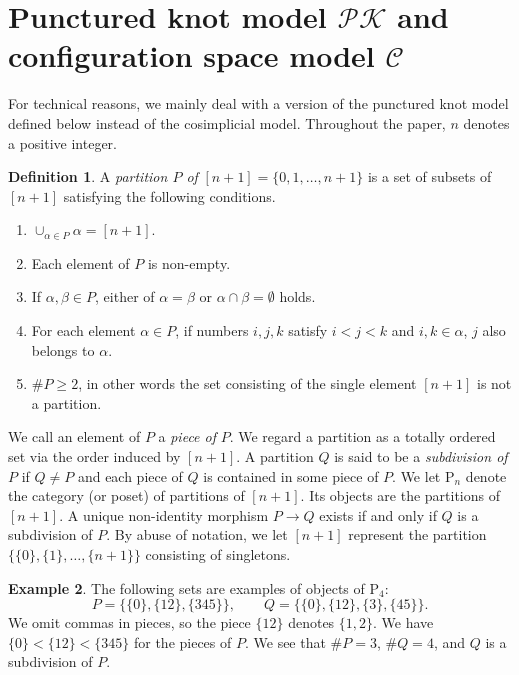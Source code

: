 \documentclass[reqno]{amsart}
\theoremstyle{definition}
\newtheorem{defi}{Definition}[section]
\newtheorem{exa}[defi]{Example}
\theoremstyle{plain}
\newcommand{\PK}{\mathcal{PK}} %
\newcommand{\PP}{\mathrm{P}} %
\begin{document}
\section{Punctured knot model $\PK$ and  configuration space model $\mathcal{C}$ }\label{SPK}
For technical reasons, we mainly deal with a version of the punctured knot model defined below instead of the cosimplicial model.  Throughout the paper, $n$ denotes a positive integer.
\begin{defi}\label{Dpartition0}
A {\em partition $P$ of } $[n+1]=\{0,1,\dots, n+1\}$ is a set of subsets of $[n+1]$ satisfying the following conditions.
\begin{enumerate}
\item $\cup_{\alpha \in P}\alpha =[n+1]$.
\item Each element of  $P$ is non-empty.
\item If $\alpha, \beta \in P$, either of $\alpha=\beta$ or $\alpha\cap \beta=\emptyset$ holds.
\item For each element  $\alpha \in P$, if numbers $i,j,k$ satisfy $i<j<k$ and $i,k\in \alpha$, $j$ also belongs to $\alpha$. 
\item $\# P\geq 2$, in other words the set consisting of the single element $[n+1]$ is not a partition. 
\end{enumerate} 
We call an element of  $P$ a {\em piece of} $P$. We regard a partition as a totally ordered set via the order induced by $[n+1]$. A partition $Q$ is said to be a {\em subdivision of} $P$ if $Q\not=P$ and each piece of $Q$ is contained in some piece of $P$. We let $\PP_n$ denote the category (or poset) of partitions of $[n+1]$. Its objects are the partitions of $[n+1]$. 
A unique non-identity morphism $P\to Q$ exists if and only if $Q$ is a subdivision of $P$. By abuse of notation, we let  $[n+1]$ represent the partition $\{\{0\},\{1\},\dots, \{n+1\}\}$ consisting  of singletons.  
\end{defi}
\begin{exa}\label{Epartition}
The following sets are examples of objects of $\PP_4$:
\[
P=\{\{0\},\{12\},\{345\}\}, \qquad Q=\{\{0\},\{12\}, \{3\}, \{45\}\}.
\]
We omit commas in pieces, so the piece $\{12\}$ denotes $\{1,2\}$.  We have $\{0\}<\{12\}<\{345\}$ for the pieces of $P$. We see that $\#P=3$, $\#Q=4$, and  $Q$ is a subdivision of $P$.  
\end{exa}
\end{document}
